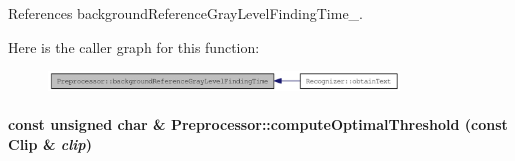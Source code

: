 References backgroundReferenceGrayLevelFindingTime\_\-.

Here is the caller graph for this function:\nopagebreak
\begin{figure}[H]
\begin{center}
\leavevmode
\includegraphics[width=264pt]{class_preprocessor_001ec84b94a5d92a2bce6b854b4d3e7d_icgraph}
\end{center}
\end{figure}
\hypertarget{class_preprocessor_ac2f414d6f4f917419f33f6067eb8634}{
\paragraph[{computeOptimalThreshold}]{\setlength{\rightskip}{0pt plus 5cm}const unsigned char \& Preprocessor::computeOptimalThreshold (const {\bf Clip} \& {\em clip})}\hfill}
\label{class_preprocessor_ac2f414d6f4f917419f33f6067eb8634}


